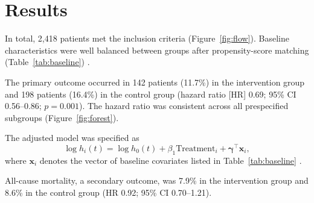 \section{Results}
\label{sec:results}

In total, 2,418 patients met the inclusion criteria (Figure~\ref{fig:flow}). Baseline characteristics were well balanced between groups after propensity-score matching (Table~\ref{tab:baseline}) \cite{austin2011introduction}.

The primary outcome occurred in 142 patients (11.7\%) in the intervention group and 198 patients (16.4\%) in the control group (hazard ratio [HR] 0.69; 95\% CI 0.56--0.86; $p = 0.001$). The hazard ratio was consistent across all prespecified subgroups (Figure~\ref{fig:forest}).

The adjusted model was specified as
\begin{equation}
  \log h_i(t) = \log h_0(t) + \beta_1 \text{Treatment}_i + \boldsymbol{\gamma}^\top \mathbf{x}_i ,
  \label{eq:cox}
\end{equation}
where $\mathbf{x}_i$ denotes the vector of baseline covariates listed in Table~\ref{tab:baseline} \cite{cox1972regression, therneau2000modeling}.

All-cause mortality, a secondary outcome, was 7.9\% in the intervention group and 8.6\% in the control group (HR 0.92; 95\% CI 0.70--1.21).
